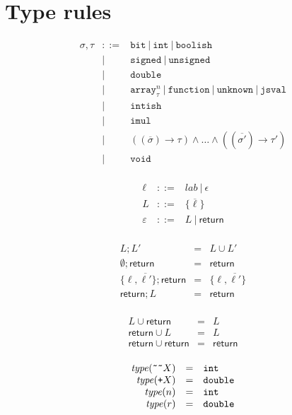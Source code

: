 \documentclass{article}
\newcommand{\type}{\mathit{type}}
\newcommand{\funty}[2]{({#1}) \rightarrow {#2}}
\newcommand{\seq}[1]{\overline{{#1}}}
\newcommand{\mathjs}[1]{\mbox{\texttt{{#1}}}}
\newcommand{\bit}{\mathtt{bit}}
\newcommand{\unsigned}{\mathtt{unsigned}}
\newcommand{\signed}{\mathtt{signed}}
\newcommand{\double}{\mathtt{double}}
\newcommand{\arr}[2]{\mathtt{array}^{#1}_{#2}}
\newcommand{\jsval}{\mathtt{jsval}}
\newcommand{\unk}{\mathtt{unknown}}
\newcommand{\void}{\mathtt{void}}
\newcommand{\mustret}{\mathsf{return}}
\newcommand{\seqcomp}{\mathrel{;}}
\newcommand{\tobits}[1]{\mathjs{\~{}\~{}}{#1}}
\newcommand{\tofloat}[1]{\mathjs{+}{#1}}
\renewcommand{\int}{\mathtt{int}}
\newcommand{\function}{\mathtt{function}}
\newcommand{\boolish}{\mathtt{boolish}}
\newcommand{\imul}{\mathtt{imul}}
\newcommand{\intish}{\mathtt{intish}}
\begin{document}
\section{Type rules}

\[
\begin{array}{rcl}
\sigma, \tau & ::= & \bit ~|~ \int ~|~ \boolish \\
             &  |  & \signed ~|~ \unsigned \\
             &  |  & \double \\
             &  |  & \arr{n}{\tau} ~|~ \function ~|~ \unk ~|~ \jsval \\
             &  |  & \intish \\
             &  |  & \imul \\
             &  |  & (\funty{\seq{\sigma}}{\tau}) \land \ldots \land (\funty{\seq{\sigma'}}{\tau'}) \\
             &  |  & \void \\
\end{array}
\]

\[
\begin{array}{rcl}
\ell        & ::= & \mathit{lab} ~|~ \epsilon \\
L           & ::= & \{ \seq{\ell} \} \\
\varepsilon & ::= & L ~|~ \mustret \\
\end{array}
\]

\[
\begin{array}{rcl}
L                       \seqcomp L'       & = & L \cup L' \\
\emptyset               \seqcomp \mustret & = & \mustret \\
\{ \ell, \seq{\ell'} \} \seqcomp \mustret & = & \{ \ell, \seq{\ell'} \} \\
\mustret                \seqcomp L        & = & \mustret \\
\end{array}
\]

\[
\begin{array}{rcl}
L        \cup \mustret & = & L \\
\mustret \cup L        & = & L \\
\mustret \cup \mustret & = & \mustret \\
\end{array}
\]

\[
\begin{array}{rcl}
\type(\tobits{X})  & = & \int \\
\type(\tofloat{X}) & = & \double \\
\type(n)           & = & \int \\
\type(r)           & = & \double \\
\end{array}
\]
\end{document}
